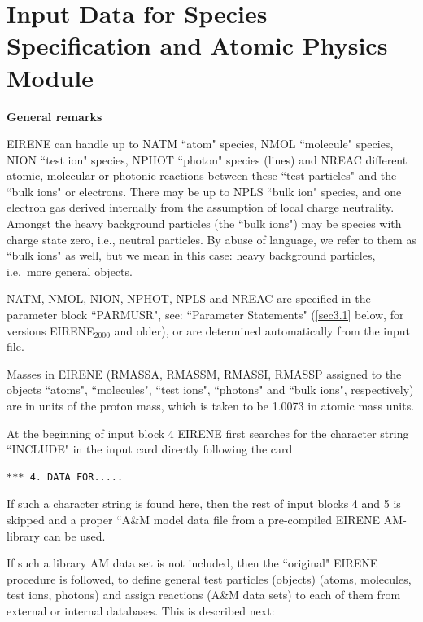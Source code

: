 \section{Input Data for Species Specification and Atomic Physics Module}
\label{sec2.4}

\textbf{General remarks}

\medskip

EIRENE can handle up to NATM ``atom" species, NMOL ``molecule" species, NION
``test ion" species, NPHOT ``photon" species (lines) and NREAC different
atomic, molecular or photonic reactions between these ``test particles" and the
``bulk ions" or electrons.
There may be up to NPLS ``bulk ion" species, and one electron gas derived
internally from the assumption of local charge neutrality.
Amongst the heavy background particles (the ``bulk ions") may be species with
charge state zero, i.e., neutral particles.
By abuse of language, we refer to them as ``bulk ions" as well, but we mean in
this case: heavy background particles, i.e.\ more general objects.

NATM, NMOL, NION, NPHOT, NPLS and NREAC are specified in the parameter block
``PARMUSR", see: ``Parameter Statements" (\cref{sec3.1} below, for versions
EIRENE$_{2000}$ and older), or are determined automatically from the input
file.

Masses in EIRENE (RMASSA, RMASSM, RMASSI, RMASSP assigned to the objects
``atoms", ``molecules", ``test ions", ``photons" and ``bulk ions",
respectively) are in units of the proton mass, which is taken to be 1.0073 in
atomic mass units.

\medskip

At the beginning of input block 4 EIRENE first searches for the character
string ``INCLUDE" in the input card directly following the card

\begin{lstlisting}
*** 4. DATA FOR.....
\end{lstlisting}

If such a character string is found here, then the rest of input blocks 4 and 5
is skipped and a proper ``A\&M model data file from a pre-compiled EIRENE
AM-library can be used.

If such a library AM data set is not included, then the ``original" EIRENE
procedure is followed, to define general test particles (objects) (atoms,
molecules, test ions, photons) and assign reactions (A\&M data sets) to each of
them from external or internal databases.
This is described next:
\bigskip

